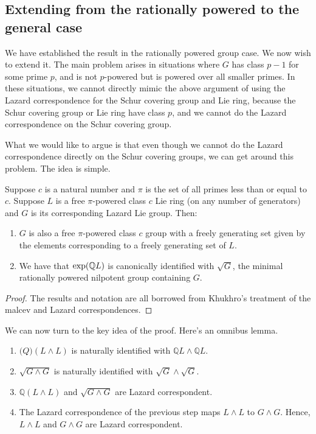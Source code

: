 \documentclass[10pt]{amsart}
\begin{document}
\subsection{Extending from the rationally powered to the general case}

We have established the result in the rationally powered group
case. We now wish to extend it. The main problem arises in situations
where $G$ has class $p - 1$ for some prime $p$, and is not $p$-powered
but is powered over all smaller primes. In these situations, we cannot
directly mimic the above argument of using the Lazard correspondence
for the Schur covering group and Lie ring, because the Schur covering
group or Lie ring have class $p$, and we cannot do the Lazard
correspondence on the Schur covering group.

What we would like to argue is that even though we cannot do the
Lazard correspondence directly on the Schur covering groups, we can
get around this problem. The idea is simple.

\begin{lemma}
  Suppose $c$ is a natural number and $\pi$ is the set of all primes
  less than or equal to $c$. Suppose $L$ is a free $\pi$-powered class
  $c$ Lie ring (on any number of generators) and $G$ is its
  corresponding Lazard Lie group. Then:

  \begin{enumerate}
  \item $G$ is also a free $\pi$-powered class $c$ group with a
    freely generating set given by the elements corresponding to a
    freely generating set of $L$.
  \item We have that $\exp(\mathbb{Q} L)$ is canonically identified with
    $\sqrt{G}$, the minimal rationally powered nilpotent group
    containing $G$.
  \end{enumerate}
\end{lemma}

\begin{proof}
  The results and notation are all borrowed from Khukhro's treatment
  of the malcev and Lazard correspondences.
\end{proof}

We can now turn to the key idea of the proof. Here's an omnibus
lemma.

\begin{lemma}
  \begin{enumerate}
  \item $\mathbb(Q)(L \wedge L)$ is naturally identified with
    $\mathbb{Q}L \wedge \mathbb{Q}L$.
  \item $\sqrt{G \wedge G}$ is naturally identified with $\sqrt{G}
    \wedge \sqrt{G}$.
  \item $\mathbb{Q}(L \wedge L) $ and $\sqrt{G \wedge G}$ are Lazard
    correspondent.
  \item The Lazard correspondence of the previous step maps $L \wedge
    L$ to $G \wedge G$. Hence, $L \wedge L$ and $G \wedge G$ are
    Lazard correspondent.
  \end{enumerate}
\end{lemma}
\end{document}
